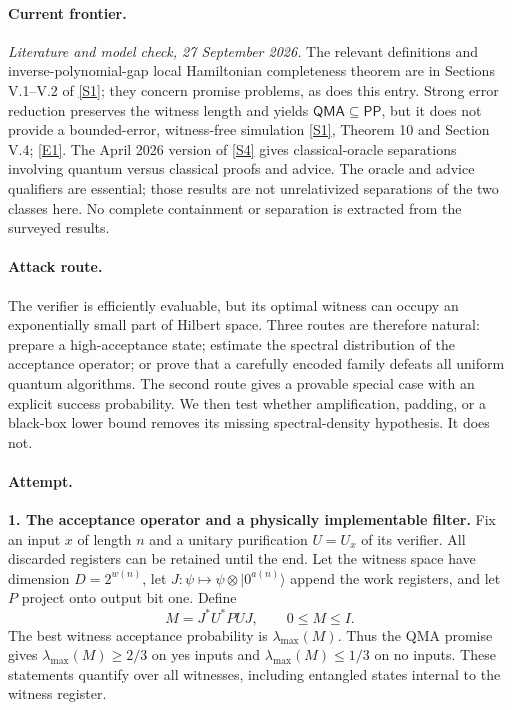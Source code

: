 \documentclass[11pt,a4paper]{article}
\newcommand{\sref}[2]{\hyperlink{source:#1:#2}{[S#2]}}
\newcommand{\eref}[2]{\hyperlink{extra:#1:#2}{[E#2]}}
\numberwithin{equation}{section}
\begin{document}
\paragraph{Current frontier.}
\textit{Literature and model check, 27 September 2026.}
The relevant definitions and inverse-polynomial-gap local Hamiltonian
completeness theorem are in Sections V.1--V.2 of \sref{48}{1}; they concern
promise problems, as does this entry. Strong error reduction preserves the
witness length and yields $\mathsf{QMA}\subseteq\mathsf{PP}$, but it does
not provide a bounded-error, witness-free simulation
\sref{48}{1}, Theorem 10 and Section V.4; \eref{48}{1}.
The April 2026 version of \sref{48}{4} gives classical-oracle separations
involving quantum versus classical proofs and advice. The oracle and advice
qualifiers are essential; those results are not unrelativized separations
of the two classes here. No complete containment or separation is extracted
from the surveyed results.

\paragraph{Attack route.}
The verifier is efficiently evaluable, but its optimal witness can occupy
an exponentially small part of Hilbert space. Three routes are therefore
natural: prepare a high-acceptance state; estimate the spectral distribution
of the acceptance operator; or prove that a carefully encoded family defeats
all uniform quantum algorithms. The second route gives a provable special
case with an explicit success probability. We then test whether amplification,
padding, or a black-box lower bound removes its missing spectral-density
hypothesis. It does not.

\paragraph{Attempt.}
\textbf{1. The acceptance operator and a physically implementable filter.}
Fix an input $x$ of length $n$ and a unitary purification $U=U_x$ of its
verifier. All discarded registers can be retained until the end. Let the
witness space have dimension $D=2^{w(n)}$, let
$J:\psi\mapsto\psi\otimes|0^{a(n)}\rangle$ append the work registers,
and let $P$ project onto output bit one. Define
\[
 M=J^*U^*PUJ,\qquad 0\le M\le I.
\]
The best witness acceptance probability is $\lambda_{\max}(M)$. Thus the
QMA promise gives $\lambda_{\max}(M)\ge2/3$ on yes inputs and
$\lambda_{\max}(M)\le1/3$ on no inputs. These statements quantify over
all witnesses, including entangled states internal to the witness register.
\end{document}
